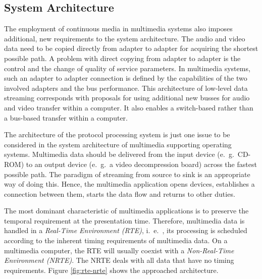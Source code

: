 
\subsection{System Architecture}
The employment of continuous media in multimedia systems also imposes additional, new requirements to the system architecture. The audio and video data need to be copied directly from adapter to adapter for acquiring the shortest possible path. A problem with direct copying from adapter to adapter is the control and the change of quality of service parameters. In multimedia systems, such an adapter to adapter connection is defined by the capabilities of the two involved adapters and the bus performance. This architecture of low-level data streaming corresponds with proposals for using additional new busses for audio and video transfer within a computer. It also enables a switch-based rather than a bus-based transfer within a computer.

The architecture of the protocol processing system is just one issue to be considered in the system architecture of multimedia supporting operating systems. Multimedia data should be delivered from the input device (e.\ g.\ CD-ROM) to an output device (e.\ g.\ a video decompression board) across the fastest possible path. The paradigm of streaming from source to sink is an appropriate way of doing this. Hence, the multimedia application opens devices, establishes a connection between them, starts the data flow and returns to other duties.


The most dominant characteristic of multimedia applications is to preserve the temporal requirement at the presentation time. Therefore, multimedia data is handled in a \textit{Real-Time Environment (RTE)}, i.\ e.\ , its processing is scheduled according to the inherent timing requirements of multimedia data. On a multimedia computer, the RTE will usually coexist with a \textit{Non-Real-Time Environment (NRTE)}. The NRTE deals with all data that have no timing requirements. Figure \ref{fig:rte-nrte} shows the approached architecture.



